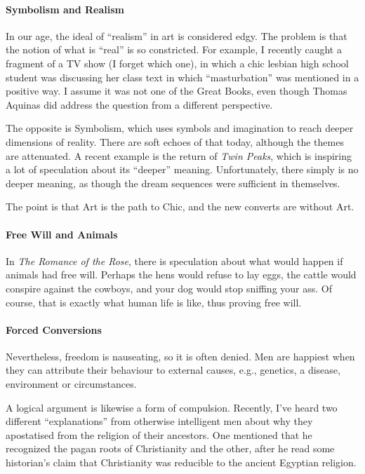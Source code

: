 \paragraph{Symbolism and Realism}


In our age, the ideal of ``realism'' in art is considered edgy. The problem is that the notion of what is ``real'' is so constricted. For example, I recently caught a fragment of a TV show (I forget which one), in which a chic lesbian high school student was discussing her class text in which ``masturbation'' was mentioned in a positive way. I assume it was not one of the Great Books, even though Thomas Aquinas did address the question from a different perspective.

The opposite is Symbolism, which uses symbols and imagination to reach deeper dimensions of reality. There are soft echoes of that today, although the themes are attenuated. A recent example is the return of \emph{Twin Peaks}, which is inspiring a lot of speculation about its ``deeper'' meaning. Unfortunately, there simply is no deeper meaning, as though the dream sequences were sufficient in themselves.

The point is that Art is the path to Chic, and the new converts are without Art.

\paragraph{Free Will and Animals}


In \emph{The Romance of the Rose}, there is speculation about what would happen if animals had free will. Perhaps the hens would refuse to lay eggs, the cattle would conspire against the cowboys, and your dog would stop sniffing your ass. Of course, that is exactly what human life is like, thus proving free will.

\paragraph{Forced Conversions}


Nevertheless, freedom is nauseating, so it is often denied. Men are happiest when they can attribute their behaviour to external causes, e.g., genetics, a disease, environment or circumstances.

A logical argument is likewise a form of compulsion. Recently, I've heard two different ``explanations'' from otherwise intelligent men about why they apostatised from the religion of their ancestors. One mentioned that he recognized the pagan roots of Christianity and the other, after he read some historian's claim that Christianity was reducible to the ancient Egyptian religion.

